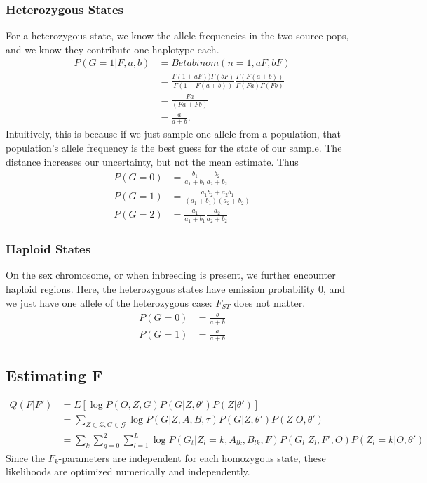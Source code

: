 \documentclass[10pt,a4paper]{article}
\begin{document}
\subsubsection{Heterozygous States}
For a heterozygous state, we know the allele frequencies in the two source pops, and we know they contribute one haplotype each.
\begin{align}
P(G=1 | F, a, b) &= Betabinom( n=1, a F, b F)\nonumber\\
&=\frac{\Gamma(1+a F))\Gamma(b F)}{\Gamma(1+F(a+b))}
\frac{\Gamma(F(a+b))}{\Gamma(F a)\Gamma(F b)}\nonumber\\
&=\frac{F a}{(Fa+Fb)}\nonumber\\
&=\frac{a}{a+b}.\label{eq:ll:het}
\end{align}
Intuitively, this is because if we just sample one allele from a population, that population's allele frequency is the best guess for the state of our sample. The distance increases our uncertainty, but not the mean estimate.
Thus
\begin{align*}
P(G=0) &= \frac{b_1}{a_1+b_1}\frac{b_2}{a_2 + b_2}\\
P(G=1) &= \frac{a_1 b_2 + a_2 b_1}{ (a_1+b_1)(a_2+b_2)}\\
P(G=2) &= \frac{a_1}{a_1+b_1}\frac{a_2}{a_2 + b_2}
\end{align*}
\subsubsection{Haploid States}
On the sex chromosome, or when inbreeding is present, we further encounter haploid regions. Here, the heterozygous states have emission probability 0, and we just have one allele of the heterozygous case: $F_{ST}$ does not matter.
\begin{align}
P(G=0) &= \frac{b}{a+b}\nonumber\\
P(G=1) &= \frac{a}{a+b}\label{eq:ll:hap}
\end{align}




\subsection{Estimating F}
\begin{align}
Q(F|F' )&= E[\log P(O, Z, G )  P(G|Z, \theta') P(Z | \theta')]\nonumber\\
&=\sum_{Z \in \mathcal{Z}, G \in \mathcal{G}} \log P(G  | Z, A, B, \tau) P(G|Z, \theta') P(Z | O, \theta')\nonumber\\
&=\sum_k\sum_{g=0}^2\sum_{l=1}^L \log P(G_t | Z_l=k, A_{lk}, B_{lk}, F)  P(G_l|Z_l, F', O) P(Z_l=k | O, \theta')
\end{align}
Since the $F_k$-parameters are independent for each homozygous state, these likelihoods are optimized numerically and independently.
\end{document}
